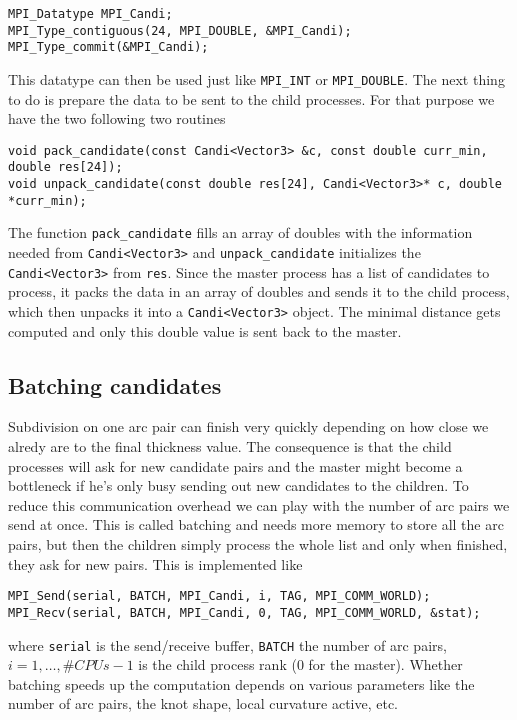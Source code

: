 \documentclass{article}
\begin{document}
\begin{verbatim}
MPI_Datatype MPI_Candi;
MPI_Type_contiguous(24, MPI_DOUBLE, &MPI_Candi);
MPI_Type_commit(&MPI_Candi);
\end{verbatim}

This datatype can then be used just like \verb+MPI_INT+ or \verb+MPI_DOUBLE+.
The next thing to do is prepare the data to be sent to the child processes.
For that purpose we have the two following two routines

\begin{verbatim}
void pack_candidate(const Candi<Vector3> &c, const double curr_min, double res[24]);
void unpack_candidate(const double res[24], Candi<Vector3>* c, double *curr_min);
\end{verbatim}

The function \verb+pack_candidate+ fills an array of doubles with the information
needed from \verb+Candi<Vector3>+ and \verb+unpack_candidate+ initializes the
\verb+Candi<Vector3>+ from \verb+res+. Since the master process has a list
of candidates to process, it packs the data in an array of doubles and sends it to
the child process, which then unpacks it into a \verb+Candi<Vector3>+ object.
The minimal distance gets computed and only this double value is sent back to
the master.

\subsection{Batching candidates}

Subdivision on one arc pair can finish very quickly depending on how close
we alredy are to the final thickness value. The consequence is that the child
processes will ask for new candidate pairs and the master might become a bottleneck
if he's only busy sending out new candidates to the children. To reduce this
communication overhead we can play with the number of arc pairs we send at once.
This is called batching and needs more memory to store all the arc pairs, but then
the children simply process the whole list and only when finished, they ask for
new pairs. This is implemented like

\begin{verbatim}
MPI_Send(serial, BATCH, MPI_Candi, i, TAG, MPI_COMM_WORLD);
MPI_Recv(serial, BATCH, MPI_Candi, 0, TAG, MPI_COMM_WORLD, &stat);
\end{verbatim}

where \verb+serial+ is the send/receive buffer, \verb+BATCH+ the number of arc
pairs, $i=1,\ldots, \#CPUs-1$ is the child process rank ($0$ for the master). Whether
batching speeds up the computation depends on various parameters like the number
of arc pairs, the knot shape, local curvature active, etc.
\end{document}

